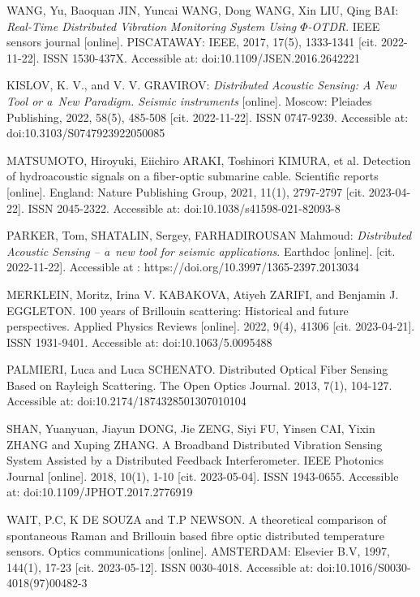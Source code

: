 \begin{thebibliography}{99}

WANG, Yu, Baoquan JIN, Yuncai WANG, Dong WANG, Xin LIU, Qing BAI: \emph{Real-Time Distributed Vibration Monitoring System Using $\Phi$-OTDR}. IEEE sensors journal [online]. PISCATAWAY: IEEE, 2017, 17(5), 1333-1341 [cit. 2022-11-22]. ISSN 1530-437X. Accessible at: doi:10.1109/JSEN.2016.2642221

KISLOV, K. V., and V. V. GRAVIROV: \emph{Distributed Acoustic Sensing: A New Tool or a~New Paradigm. Seismic instruments} [online]. Moscow: Pleiades Publishing, 2022, 58(5), 485-508 [cit. 2022-11-22]. ISSN 0747-9239. Accessible at: doi:10.3103/S0747923922050085

MATSUMOTO, Hiroyuki, Eiichiro ARAKI, Toshinori KIMURA, et al. Detection of hydroacoustic signals on a fiber-optic submarine cable. Scientific reports [online]. England: Nature Publishing Group, 2021, 11(1), 2797-2797 [cit. 2023-04-22]. ISSN 2045-2322. Accessible at: doi:10.1038/s41598-021-82093-8

PARKER, Tom, SHATALIN, Sergey, FARHADIROUSAN Mahmoud: \emph{Distributed Acoustic Sensing – a~new tool for seismic applications}. Earthdoc [online]. [cit. 2022-11-22]. Accessible at
: https://doi.org/10.3997/1365-2397.2013034

MERKLEIN, Moritz, Irina V. KABAKOVA, Atiyeh ZARIFI, and Benjamin J. EGGLETON. 100 years of Brillouin scattering: Historical and future perspectives. Applied Physics Reviews [online]. 2022, 9(4), 41306 [cit. 2023-04-21]. ISSN 1931-9401. Accessible at: doi:10.1063/5.0095488

PALMIERI, Luca and Luca SCHENATO. Distributed Optical Fiber Sensing Based on Rayleigh Scattering. The Open Optics Journal. 2013, 7(1), 104-127. Accessible at: doi:10.2174/1874328501307010104

SHAN, Yuanyuan, Jiayun DONG, Jie ZENG, Siyi FU, Yinsen CAI, Yixin ZHANG and Xuping ZHANG. A Broadband Distributed Vibration Sensing System Assisted by a Distributed Feedback Interferometer. IEEE Photonics Journal [online]. 2018, 10(1), 1-10 [cit. 2023-05-04]. ISSN 1943-0655. Accessible at: doi:10.1109/JPHOT.2017.2776919

WAIT, P.C, K DE SOUZA and T.P NEWSON. A theoretical comparison of spontaneous Raman and Brillouin based fibre optic distributed temperature sensors. Optics communications [online]. AMSTERDAM: Elsevier B.V, 1997, 144(1), 17-23 [cit. 2023-05-12]. ISSN 0030-4018. Accessible at: doi:10.1016/S0030-4018(97)00482-3


\end{thebibliography}
